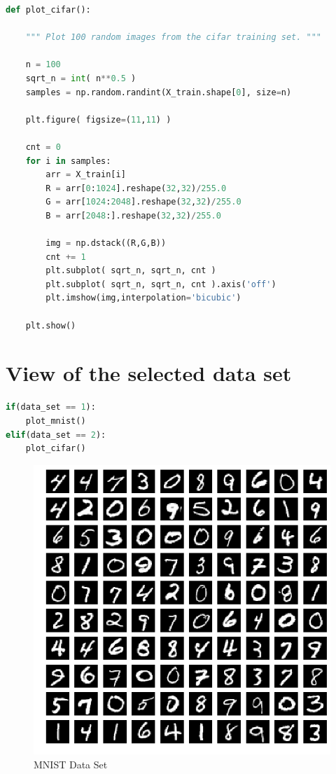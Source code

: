\documentclass[11pt]{article}
\begin{document}
\begin{lstlisting}[language = Python]
def plot_cifar():
    
    """ Plot 100 random images from the cifar training set. """  
    
    n = 100
    sqrt_n = int( n**0.5 )
    samples = np.random.randint(X_train.shape[0], size=n)

    plt.figure( figsize=(11,11) )

    cnt = 0
    for i in samples:
        arr = X_train[i]
        R = arr[0:1024].reshape(32,32)/255.0
        G = arr[1024:2048].reshape(32,32)/255.0
        B = arr[2048:].reshape(32,32)/255.0

        img = np.dstack((R,G,B))
        cnt += 1
        plt.subplot( sqrt_n, sqrt_n, cnt )
        plt.subplot( sqrt_n, sqrt_n, cnt ).axis('off')
        plt.imshow(img,interpolation='bicubic')

    plt.show()
\end{lstlisting}


\newpage
\section{View of the selected data set}

\begin{lstlisting}[language = Python]
if(data_set == 1):
    plot_mnist()
elif(data_set == 2):
    plot_cifar()
\end{lstlisting}
\hfill

\begin{figure}[ht!]
  \includegraphics[width=\linewidth, scale=0.1]{./Project_1_files/Project_1_22_1.png}
  \caption{MNIST Data Set}
  \label{fig:mnist}
\end{figure}
\end{document}
